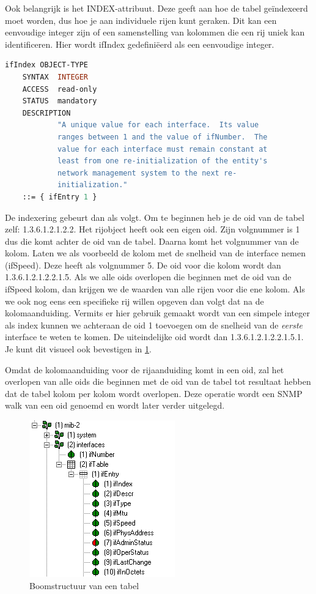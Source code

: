 Ook belangrijk is het INDEX-attribuut. Deze geeft aan hoe de tabel geïndexeerd moet worden, dus hoe je aan individuele rijen kunt geraken.
Dit kan een eenvoudige integer zijn of een samenstelling van kolommen die een rij uniek kan identificeren.
Hier wordt ifIndex gedefiniëerd als een eenvoudige integer.

\begin{lstlisting}[language=asn.1, float=h, caption={Definitie van ifIndex}, label=definitie-ifindex]
ifIndex OBJECT-TYPE
	SYNTAX	INTEGER
	ACCESS	read-only
	STATUS	mandatory
	DESCRIPTION
			"A unique value for each interface.  Its value
			ranges between 1 and the value of ifNumber.  The
			value for each interface must remain constant at
			least from one re-initialization of the entity's
			network management system to the next re-
			initialization."
	::= { ifEntry 1 }
\end{lstlisting}

De indexering gebeurt dan als volgt. Om te beginnen heb je de \gls{oid} van de tabel zelf: 1.3.6.1.2.1.2.2.
Het rijobject heeft ook een eigen \gls{oid}. Zijn volgnummer is 1 dus die komt achter de \gls{oid} van de tabel.
Daarna komt het volgnummer van de kolom. Laten we als voorbeeld de kolom met de snelheid van de interface nemen (ifSpeed).
Deze heeft als volgnummer 5. De \gls{oid} voor die kolom wordt dan 1.3.6.1.2.1.2.2.1.5.
Als we alle \glspl{oid} overlopen die beginnen met de \gls{oid} van de ifSpeed kolom, dan krijgen we de waarden van alle rijen voor die ene kolom.
Als we ook nog eens een specifieke rij willen opgeven dan volgt dat na de kolomaanduiding.
Vermits er hier gebruik gemaakt wordt van een simpele integer als index kunnen we achteraan de \gls{oid} 1 toevoegen om 
de snelheid van de \emph{eerste} interface te weten te komen. De uiteindelijke \gls{oid} wordt dan 1.3.6.1.2.1.2.2.1.5.1.
Je kunt dit visueel ook bevestigen in \cref{boomstructuur-tabel}.

Omdat de kolomaanduiding voor de rijaanduiding komt in een \gls{oid},
zal het overlopen van alle \glspl{oid} die beginnen met de \gls{oid} van de tabel tot resultaat hebben dat de tabel kolom per kolom wordt overlopen.
Deze operatie wordt een SNMP walk van een \gls{oid} genoemd en wordt later verder uitgelegd.

\begin{figure}[h]
	\centering
	\includegraphics[resolution=110]{figures/snmp/ifTable-cropped}
	\caption{Boomstructuur van een tabel}
	\label{boomstructuur-tabel}
\end{figure}


